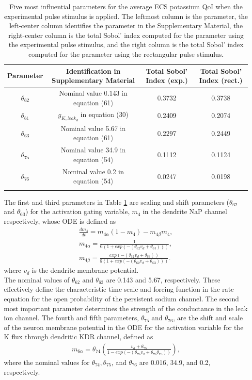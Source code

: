 \begin{table}[h]
\centering
{}
\begin{tabular}{cccc}
\toprule
Parameter & Identification in Supplementary Material & Total Sobol' Index (exp.) & Total Sobol' Index (rect.)\\
\midrule
$\theta_{62}$ & Nominal value 0.143 in equation (61) &  0.3732 & 0.3738\\
$\theta_{61}$ & $g_{K,leak_d}$ in equation (30) & 0.2409 & 0.2074\\
$\theta_{63}$ &  Nominal value 5.67 in equation (61) &  0.2297 & 0.2449 \\
$\theta_{75}$ & Nominal value 34.9 in equation (54) & 0.1112 & 0.1124\\
$\theta_{76}$ & Nominal value 0.2 in equation (54) & 0.0247 & 0.0198\\
 \arrayrulecolor{black}\bottomrule
\end{tabular}
\caption{Five most influential parameters for the average ECS potassium QoI when the experimental pulse stimulus is applied. The leftmost column is the parameter, the left-center column identifies the parameter in the Supplementary Material, the right-center column is the total Sobol' index computed for the parameter using the experimental pulse stimulus, and the right column is the total Sobol' index computed for the parameter using the rectangular pulse stimulus.}
\label{tab:K_ECS_Mean}
\end{table}
The first and third parameters in Table \ref{tab:K_ECS_Mean} are scaling and shift parameters ($\theta_{62}$ and $\theta_{63}$) for the activation gating variable, $m_4$ in the dendrite NaP channel respectively, whose ODE is defined as 
\begin{eqnarray}\label{eqn:m4}
\frac{dm_4}{dt}=m_{4 \alpha}(1-m_4)-m_{4 \beta}m_4, \nonumber \\
m_{4 \alpha}=  \frac{1}{6(1 + exp(-(\theta_{62}  v_d + \theta_{63})))},\nonumber \\
m_{4 \beta}= \frac{exp(-(\theta_{62} v_d + \theta_{63}))}{6(1 + exp(-(\theta_{62} v_d + \theta_{63})))}.
\end{eqnarray}
where $v_d$ is the dendrite membrane potential. \\
The nominal values of $\theta_{62}$ and $\theta_{63}$ are 0.143 and 5.67, respectively. These effectively define the characteristic time scale and forcing function in the rate equation for the open  probability of the persistent sodium channel. The second most important parameter determines the strength of the  conductance in the \pot leak ion channel. The fourth and fifth parameters, $\theta_{75}$ and $\theta_{76}$, are the shift and scale of the neuron membrane potential in the ODE for the activation variable for the  K flux through dendritic KDR channel, defined as 
\begin{eqnarray}\label{eqn:m6}
m_{6  \alpha}     = \theta_{74} \left(\frac{v_d + \theta_{75}}{1 - exp(-(\theta_{76}  v_d + \theta_{76} \theta_{75}))} \right), 
\end{eqnarray}
where the nominal values for $\theta_{74}, \theta_{75}$, and $\theta_{76}$ are 0.016, 34.9, and 0.2, respectively. 

